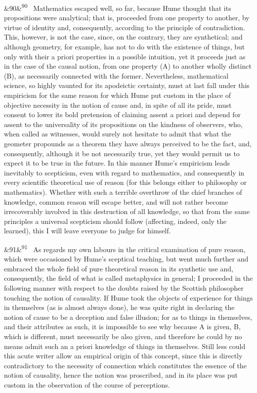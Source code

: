 \documentclass[12pt]{article}
\newcommand{\para}[1][]{\par\noindent\ifx&#1&\else\textsuperscript{\footnotesize #1}~\fi}
\begin{document}
\para[90] Mathematics escaped well, so far, because Hume thought that its propositions were analytical; that is, proceeded from one property to another, by virtue of identity and, consequently, according to the principle of contradiction. This, however, is not the case, since, on the contrary, they are synthetical; and although geometry, for example, has not to do with the existence of things, but only with their a priori properties in a possible intuition, yet it proceeds just as in the case of the causal notion, from one property (A) to another wholly distinct (B), as necessarily connected with the former. Nevertheless, mathematical science, so highly vaunted for its apodeictic certainty, must at last fall under this empiricism for the same reason for which Hume put custom in the place of objective necessity in the notion of cause and, in spite of all its pride, must consent to lower its bold pretension of claiming assent a priori and depend for assent to the universality of its propositions on the kindness of observers, who, when called as witnesses, would surely not hesitate to admit that what the geometer propounds as a theorem they have always perceived to be the fact, and, consequently, although it be not necessarily true, yet they would permit us to expect it to be true in the future. In this manner Hume's empiricism leads inevitably to scepticism, even with regard to mathematics, and consequently in every scientific theoretical use of reason (for this belongs either to philosophy or mathematics). Whether with such a terrible overthrow of the chief branches of knowledge, common reason will escape better, and will not rather become irrecoverably involved in this destruction of all knowledge, so that from the same principles a universal scepticism should follow (affecting, indeed, only the learned), this I will leave everyone to judge for himself.

\para[91] As regards my own labours in the critical examination of pure reason, which were occasioned by Hume's sceptical teaching, but went much further and embraced the whole field of pure theoretical reason in its synthetic use and, consequently, the field of what is called metaphysics in general; I proceeded in the following manner with respect to the doubts raised by the Scottish philosopher touching the notion of causality. If Hume took the objects of experience for things in themselves (as is almost always done), he was quite right in declaring the notion of cause to be a deception and false illusion; for as to things in themselves, and their attributes as such, it is impossible to see why because A is given, B, which is different, must necessarily be also given, and therefore he could by no means admit such an a priori knowledge of things in themselves. Still less could this acute writer allow an empirical origin of this concept, since this is directly contradictory to the necessity of connection which constitutes the essence of the notion of causality, hence the notion was proscribed, and in its place was put custom in the observation of the course of perceptions.
\end{document}
